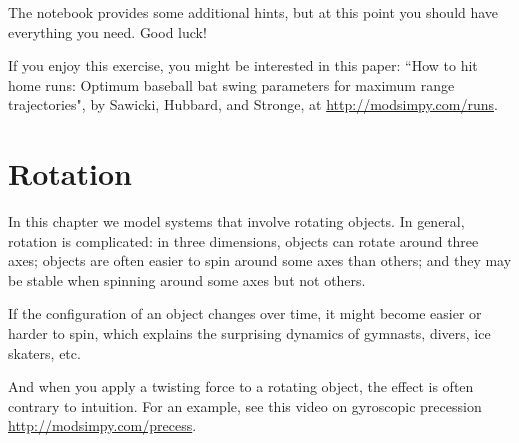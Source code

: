 \documentclass[12pt]{book}
\theoremstyle{exercise}
\newcommand{\py}{\verb}%}
\begin{document}

The notebook provides some additional hints, but at this point you should have everything you need.  Good luck!

If you enjoy this exercise, you might be interested in this paper: ``How to hit home runs: Optimum baseball bat swing parameters for maximum range trajectories", by Sawicki, Hubbard, and Stronge, at \url{http://modsimpy.com/runs}.


\chapter{Rotation}
\label{chap24}

In this chapter we model systems that involve rotating objects.  In general, rotation is complicated:  in three dimensions, objects can rotate around three axes; objects are often easier to spin around some axes than others; and they may be stable when spinning around some axes but not others.


If the configuration of an object changes over time, it might become easier or harder to spin, which explains the surprising dynamics of gymnasts, divers, ice skaters, etc.

And when you apply a twisting force to a rotating object, the effect is often contrary to intuition.  For an example, see this video on gyroscopic precession \url{http://modsimpy.com/precess}.
\end{document}
